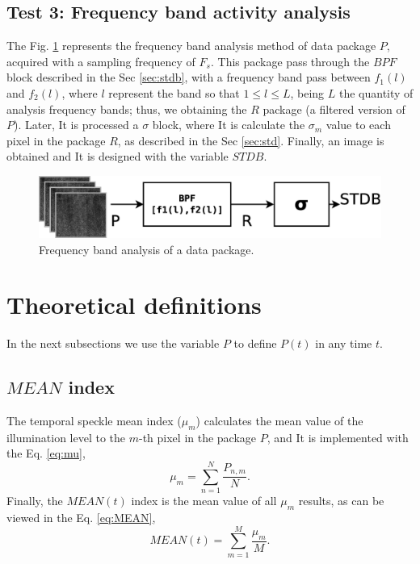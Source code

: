\documentclass[review]{elsarticle}
\begin{document}
\subsection{Test 3: Frequency band activity analysis}
\label{subsec:test3}

The Fig. \ref{fig:test3} represents the frequency band analysis method of data package $P$, 
acquired  with a sampling frequency of $F_s$. This package pass through the $BPF$ block
described in the Sec \ref{sec:stdb}, with a frequency band pass between $f_1(l)$ and $f_2(l)$,
where $l$ represent the band so that $1\leq l\leq L$,
being $L$ the quantity of analysis frequency bands; 
thus, we obtaining the  $R$ package (a filtered version of $P$). Later, It is processed 
a $\sigma$ block, where It is calculate the $\sigma_{m}$ value to each pixel in the package $R$,
as described in the Sec \ref{sec:std}. Finally, 
an image is obtained and It is designed with the variable $STDB$.
\begin{figure}[ht!]
\centering
\includegraphics[width=0.55\columnwidth]{test3.eps}
\caption{Frequency band analysis of a data package.}
\label{fig:test3}
\end{figure}

 

\section{Theoretical definitions}
\label{sec:theoretical}

In the next subsections we use the variable $P$ to define $P(t)$ in any time $t$.

\subsection{$MEAN$ index }
\label{sec:mean}

The temporal speckle mean index ($\mu_{m}$) \cite{Nothdurft:05} calculates the mean
value of the illumination level to the $m$-th pixel in the package $P$, and It is implemented
with the Eq. \ref{eq:mu},
\begin{equation}\label{eq:mu}
\mu_{m} = \sum \limits_{n=1}^{N} \frac{P_{n,m}}{N}.
\end{equation}
Finally, the $MEAN(t)$ index is the mean value of all $\mu_{m}$ results,
as can be viewed in the Eq. \ref{eq:MEAN},
\begin{equation}\label{eq:MEAN}
MEAN(t) = \sum \limits_{m=1}^{M} \frac{\mu_{m}}{M}.
\end{equation}
\end{document}
